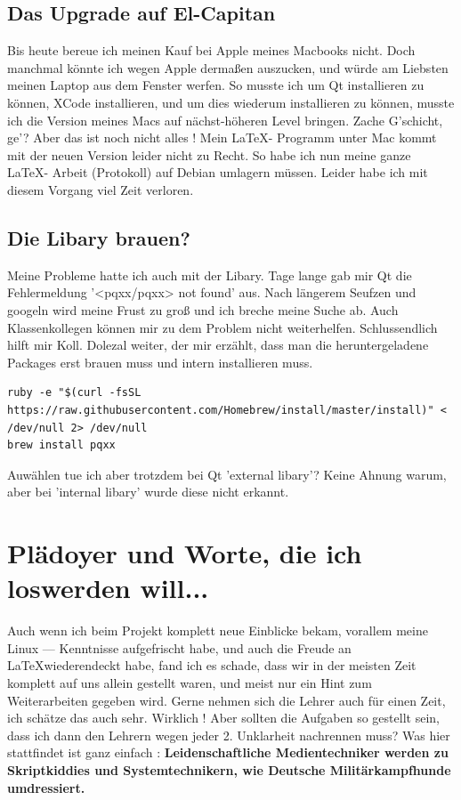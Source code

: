 \subsection{Das Upgrade auf El-Capitan}
Bis heute bereue ich meinen Kauf bei Apple meines Macbooks nicht.
Doch manchmal könnte ich wegen Apple dermaßen auszucken, und würde 
am Liebsten meinen Laptop aus dem Fenster werfen.
So musste ich um Qt installieren zu können,
XCode installieren, und um dies wiederum installieren zu können,
musste ich die Version meines Macs auf nächst-höheren Level bringen.
Zache G'schicht, ge'?
Aber das ist noch nicht alles !
Mein \LaTeX - Programm unter Mac kommt mit der neuen Version leider nicht zu Recht. So habe ich nun meine ganze \LaTeX - Arbeit (Protokoll) auf Debian umlagern müssen.
Leider habe ich mit diesem Vorgang viel Zeit verloren.

\subsection{Die Libary brauen?}
Meine Probleme hatte ich auch mit der Libary.
Tage lange gab mir Qt die Fehlermeldung '<pqxx/pqxx> not found' aus.
Nach längerem Seufzen und googeln wird meine Frust zu groß und ich breche meine Suche ab.
Auch Klassenkollegen können mir zu dem Problem nicht weiterhelfen.
Schlussendlich hilft mir Koll. Dolezal weiter, der mir erzählt, dass man die heruntergeladene Packages
erst brauen muss und intern installieren muss.

\lstset{language=bash}
\begin{lstlisting}
ruby -e "$(curl -fsSL https://raw.githubusercontent.com/Homebrew/install/master/install)" < /dev/null 2> /dev/null
brew install pqxx
\end{lstlisting}

Auwählen tue ich aber trotzdem bei Qt 'external libary'?
Keine Ahnung warum, aber bei 'internal libary' wurde diese nicht erkannt.


\newpage
\section{Plädoyer und Worte, die ich loswerden will...}
Auch wenn ich beim Projekt komplett neue Einblicke bekam, vorallem meine Linux --- Kenntnisse aufgefrischt habe, und auch die Freude an \LaTeX  wiederendeckt habe, fand ich es schade, dass wir in der meisten Zeit komplett auf uns allein gestellt waren, und meist nur ein Hint zum Weiterarbeiten gegeben wird. Gerne nehmen sich die Lehrer auch für einen Zeit, ich schätze das auch sehr. Wirklich ! Aber sollten die Aufgaben so gestellt sein, dass ich dann den Lehrern wegen jeder 2. Unklarheit nachrennen muss?
Was hier stattfindet ist ganz einfach :
\linebreak
\textbf{Leidenschaftliche Medientechniker werden zu Skriptkiddies und Systemtechnikern, wie Deutsche Militärkampfhunde umdressiert.}

